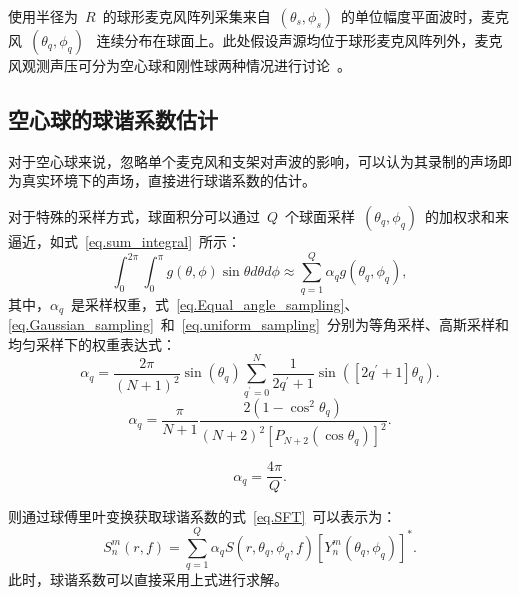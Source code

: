 使用半径为~$R$~的球形麦克风阵列采集来自~$(\theta_s,\phi_s)$~的单位幅度平面波时，麦克风~$(\theta _q,\phi _q)$~ 连续分布在球面上。此处假设声源均位于球形麦克风阵列外，麦克风观测声压可分为空心球和刚性球两种情况进行讨论~。

\subsection{空心球的球谐系数估计}

对于空心球来说，忽略单个麦克风和支架对声波的影响，可以认为其录制的声场即为真实环境下的声场，直接进行球谐系数的估计。

对于特殊的采样方式，球面积分可以通过~$Q$~个球面采样~$(\theta_{q},\phi_{q})$~的加权求和来逼近，如式~\eqref{eq.sum_integral}~所示：
\begin{equation}\label{eq.sum_integral}
   \int_{0}^{2\pi}\int _{0}^{\pi} g(\theta,\phi) \sin\theta d\theta d\phi \approx \sum_{q=1}^{Q} \alpha_{q} g(\theta_{q},\phi_{q}),
\end{equation}
其中，$\alpha_{q}$~是采样权重，式~\eqref{eq.Equal_angle_sampling}、\eqref{eq.Gaussian_sampling}~和~\eqref{eq.uniform_sampling}~分别为等角采样、高斯采样和均匀采样下的权重表达式：
\begin{equation}\label{eq.Equal_angle_sampling}
\alpha_{q}=\frac{2 \pi}{(N+1)^{2}} \sin \left(\theta_{q}\right) \sum_{q^{\prime}=0}^{N} \frac{1}{2 q^{\prime}+1} \sin \left(\left[2 q^{\prime}+1\right] \theta_{q}\right).
\end{equation}
\begin{equation}\label{eq.Gaussian_sampling}
\alpha_{q}=\frac{\pi}{N+1} \frac{2\left(1-\cos ^{2} \theta_{q}\right)}{(N+2)^{2}\left[P_{N+2}\left(\cos \theta_{q}\right)\right]^{2}}.
\end{equation}

\begin{equation}\label{eq.uniform_sampling}
   \alpha_{q} = \frac{4\pi}{Q}.
\end{equation}

则通过球傅里叶变换获取球谐系数的式~\eqref{eq.SFT}~可以表示为：
\begin{equation}\label{eq.sample_coe}
   S_n ^m(r,f)=\sum_{q=1}^{Q} \alpha_{q} S(r,\theta_{q},\phi_{q},f)[{Y_n^{m}(\theta_{q},\phi_{q})}]^{*}.
\end{equation}
此时，球谐系数可以直接采用上式进行求解。


